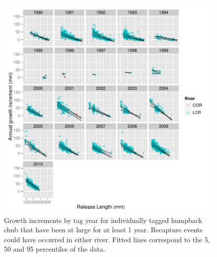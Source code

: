 \begin{figure}[htbp]
	\centering
		\includegraphics[width=6.5in]{../FIGS/LSMR/fig:GrowthIncrements.pdf}
	\caption{Growth increments by tag year for individually tagged humpback chub that have been at large for at least 1 year.   Recapture events could have occurred in either river. Fitted lines correspond to the 5, 50 and 95 percentiles of the data.}
	\label{fig:FIGS_LSMR_fig:GrowthIncrements}
\end{figure}

